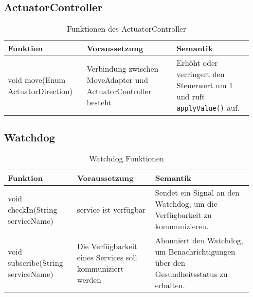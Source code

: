     \subsection{ActuatorController}
    \begin{table}[h!]
        \centering
        \begin{tabular}{|p{5cm}|p{5cm}|p{5cm}|}
            \hline
            \textbf{Funktion} & \textbf{Voraussetzung} & \textbf{Semantik} \\
            \hline
            void move(Enum ActuatorDirection) & Verbindung zwischen MoveAdapter und ActuatorController besteht & Erhöht oder verringert den Steuerwert um 1 und ruft \texttt{applyValue()} auf. \\
            \hline
        \end{tabular}
        \caption{Funktionen des ActuatorController}
        \label{tab:ActuatorController}
    \end{table}

    \subsection{Watchdog}
    \begin{table}[h!]
        \centering
        \begin{tabular}{|p{5cm}|p{5cm}|p{5cm}|}
            \hline
            \textbf{Funktion} & \textbf{Voraussetzung} & \textbf{Semantik} \\
            \hline
            void checkIn(String serviceName) & service ist verfügbar & Sendet ein Signal an den Watchdog, um die Verfügbarkeit zu kommunizieren. \\
            \hline
            void subscribe(String serviceName) & Die Verfügbarkeit eines Services soll kommuniziert werden & Abonniert den Watchdog, um Benachrichtigungen über den Gesundheitsstatus zu erhalten. \\
            \hline
        \end{tabular}
        \caption{Watchdog Funktionen}
        \label{tab:WatchdogFunktionen}
    \end{table}





